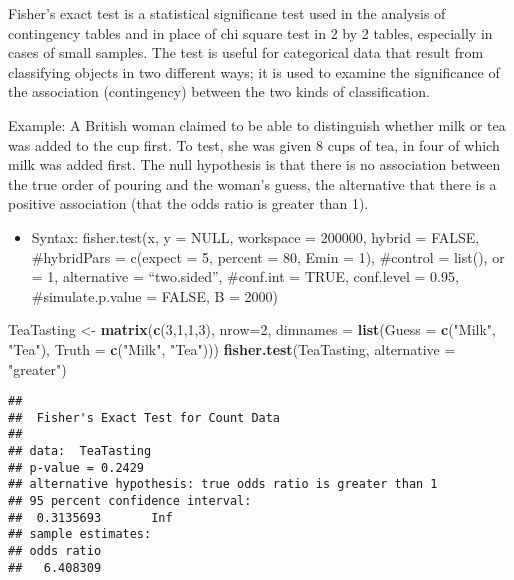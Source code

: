 \documentclass[]{article}
\newenvironment{Shaded}{\begin{snugshade}}{\end{snugshade}}
\newcommand{\DataTypeTok}[1]{\textcolor[rgb]{0.13,0.29,0.53}{#1}}
\newcommand{\DecValTok}[1]{\textcolor[rgb]{0.00,0.00,0.81}{#1}}
\newcommand{\KeywordTok}[1]{\textcolor[rgb]{0.13,0.29,0.53}{\textbf{#1}}}
\newcommand{\NormalTok}[1]{#1}
\newcommand{\StringTok}[1]{\textcolor[rgb]{0.31,0.60,0.02}{#1}}
\providecommand{\tightlist}{%
  \setlength{\itemsep}{0pt}\setlength{\parskip}{0pt}}
\begin{document}
Fisher's exact test is a statistical significane test used in the
analysis of contingency tables and in place of chi square test in 2 by 2
tables, especially in cases of small samples. The test is useful for
categorical data that result from classifying objects in two different
ways; it is used to examine the significance of the association
(contingency) between the two kinds of classification.

Example: A British woman claimed to be able to distinguish whether milk
or tea was added to the cup first. To test, she was given 8 cups of tea,
in four of which milk was added first. The null hypothesis is that there
is no association between the true order of pouring and the woman's
guess, the alternative that there is a positive association (that the
odds ratio is greater than 1).

\begin{itemize}
\tightlist
\item
  Syntax: fisher.test(x, y = NULL, workspace = 200000, hybrid = FALSE,
  \#hybridPars = c(expect = 5, percent = 80, Emin = 1), \#control =
  list(), or = 1, alternative = ``two.sided'', \#conf.int = TRUE,
  conf.level = 0.95, \#simulate.p.value = FALSE, B = 2000)
\end{itemize}

\begin{Shaded}
\begin{Highlighting}[]
\NormalTok{TeaTasting <-}
\StringTok{  }\KeywordTok{matrix}\NormalTok{(}\KeywordTok{c}\NormalTok{(}\DecValTok{3}\NormalTok{,}\DecValTok{1}\NormalTok{,}\DecValTok{1}\NormalTok{,}\DecValTok{3}\NormalTok{), }
         \DataTypeTok{nrow=}\DecValTok{2}\NormalTok{, }
         \DataTypeTok{dimnames =} \KeywordTok{list}\NormalTok{(}\DataTypeTok{Guess =} \KeywordTok{c}\NormalTok{(}\StringTok{"Milk"}\NormalTok{, }\StringTok{"Tea"}\NormalTok{), }
                         \DataTypeTok{Truth =} \KeywordTok{c}\NormalTok{(}\StringTok{"Milk"}\NormalTok{, }\StringTok{"Tea"}\NormalTok{)))}
\KeywordTok{fisher.test}\NormalTok{(TeaTasting, }\DataTypeTok{alternative =} \StringTok{"greater"}\NormalTok{)}
\end{Highlighting}
\end{Shaded}

\begin{verbatim}
## 
##  Fisher's Exact Test for Count Data
## 
## data:  TeaTasting
## p-value = 0.2429
## alternative hypothesis: true odds ratio is greater than 1
## 95 percent confidence interval:
##  0.3135693       Inf
## sample estimates:
## odds ratio 
##   6.408309
\end{verbatim}
\end{document}
